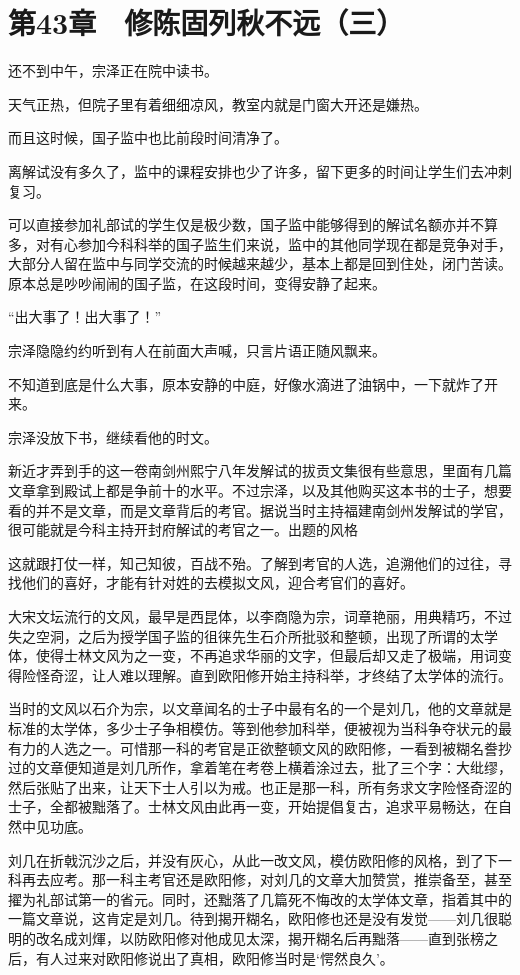 \section{第43章　修陈固列秋不远（三）}

还不到中午，宗泽正在院中读书。

天气正热，但院子里有着细细凉风，教室内就是门窗大开还是嫌热。

而且这时候，国子监中也比前段时间清净了。

离解试没有多久了，监中的课程安排也少了许多，留下更多的时间让学生们去冲刺复习。

可以直接参加礼部试的学生仅是极少数，国子监中能够得到的解试名额亦并不算多，对有心参加今科科举的国子监生们来说，监中的其他同学现在都是竞争对手，大部分人留在监中与同学交流的时候越来越少，基本上都是回到住处，闭门苦读。原本总是吵吵闹闹的国子监，在这段时间，变得安静了起来。

“出大事了！出大事了！”

宗泽隐隐约约听到有人在前面大声喊，只言片语正随风飘来。

不知道到底是什么大事，原本安静的中庭，好像水滴进了油锅中，一下就炸了开来。

宗泽没放下书，继续看他的时文。

新近才弄到手的这一卷南剑州熙宁八年发解试的拔贡文集很有些意思，里面有几篇文章拿到殿试上都是争前十的水平。不过宗泽，以及其他购买这本书的士子，想要看的并不是文章，而是文章背后的考官。据说当时主持福建南剑州发解试的学官，很可能就是今科主持开封府解试的考官之一。出题的风格

这就跟打仗一样，知己知彼，百战不殆。了解到考官的人选，追溯他们的过往，寻找他们的喜好，才能有针对姓的去模拟文风，迎合考官们的喜好。

大宋文坛流行的文风，最早是西昆体，以李商隐为宗，词章艳丽，用典精巧，不过失之空洞，之后为授学国子监的徂徕先生石介所批驳和整顿，出现了所谓的太学体，使得士林文风为之一变，不再追求华丽的文字，但最后却又走了极端，用词变得险怪奇涩，让人难以理解。直到欧阳修开始主持科举，才终结了太学体的流行。

当时的文风以石介为宗，以文章闻名的士子中最有名的一个是刘几，他的文章就是标准的太学体，多少士子争相模仿。等到他参加科举，便被视为当科争夺状元的最有力的人选之一。可惜那一科的考官是正欲整顿文风的欧阳修，一看到被糊名誊抄过的文章便知道是刘几所作，拿着笔在考卷上横着涂过去，批了三个字：大纰缪，然后张贴了出来，让天下士人引以为戒。也正是那一科，所有务求文字险怪奇涩的士子，全都被黜落了。士林文风由此再一变，开始提倡复古，追求平易畅达，在自然中见功底。

刘几在折戟沉沙之后，并没有灰心，从此一改文风，模仿欧阳修的风格，到了下一科再去应考。那一科主考官还是欧阳修，对刘几的文章大加赞赏，推崇备至，甚至擢为礼部试第一的省元。同时，还黜落了几篇死不悔改的太学体文章，指着其中的一篇文章说，这肯定是刘几。待到揭开糊名，欧阳修也还是没有发觉——刘几很聪明的改名成刘煇，以防欧阳修对他成见太深，揭开糊名后再黜落——直到张榜之后，有人过来对欧阳修说出了真相，欧阳修当时是‘愕然良久’。

